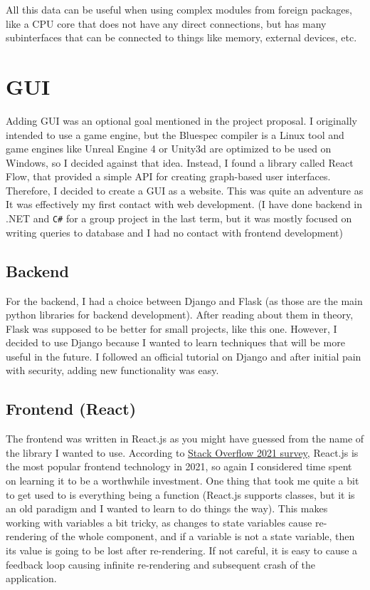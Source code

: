 \documentclass[12pt]{report}
\begin{document}
All this data can be useful when using complex modules from foreign packages, like a CPU core that does not have any direct connections, but has many subinterfaces that can be connected to things like memory, external devices, etc.

\section{GUI}
Adding GUI was an optional goal mentioned in the project proposal. I originally intended to use a game engine, but the Bluespec compiler is a Linux tool and game engines like Unreal Engine 4 or Unity3d are optimized to be used on Windows, so I decided against that idea. Instead, I found a library called React Flow, that provided a simple API for creating graph-based user interfaces. Therefore, I decided to create a GUI as a website. This was quite an adventure as It was effectively my first contact with web development. (I have done backend in .NET and \verb!C#! for a group project in the last term, but it was mostly focused on writing queries to database and I had no contact with frontend development)

\subsection{Backend}
For the backend, I had a choice between Django and Flask (as those are the main python libraries for backend development). After reading about them in theory, Flask was supposed to be better for small projects, like this one. However, I decided to use Django because I wanted to learn techniques that will be more useful in the future. I followed an official tutorial on Django and after initial pain with security, adding new functionality was easy.

\subsection{Frontend (React)}

The frontend was written in React.js as you might have guessed from the name of the library I wanted to use. According to \href{https://insights.stackoverflow.com/survey/2021#most-popular-technologies-webframe}{Stack Overflow 2021 survey}, React.js is the most popular frontend technology in 2021, so again I considered time spent on learning it to be a worthwhile investment. One thing that took me quite a bit to get used to is everything being a function (React.js supports classes, but it is an old paradigm and I wanted to learn to do things the  way). This makes working with variables a bit tricky, as changes to state variables cause re-rendering of the whole component, and if a variable is not a state variable, then its value is going to be lost after re-rendering. If not careful, it is easy to cause a feedback loop causing infinite re-rendering and subsequent crash of the application.
\end{document}
